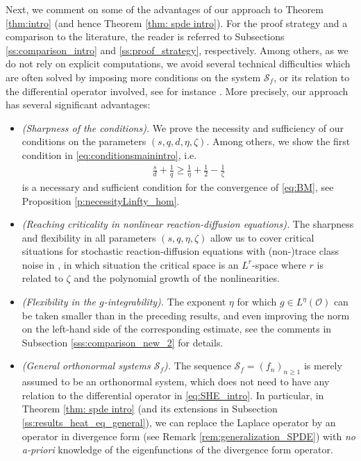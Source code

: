 \documentclass[reqno]{amsart}
\theoremstyle{plain}
\theoremstyle{remark}
\theoremstyle{plain}
\numberwithin{equation}{section}
\newcommand\cO{\mathcal{O}}
\newcommand{\1}{\one}
\newcommand{\Sf}{\mathcal{S}_{f}}
\begin{document}
\smallskip

Next, we comment on some of the advantages of our approach to Theorem \ref{thm:intro} (and hence Theorem \ref{thm: spde intro}). For the proof strategy and a comparison to the literature, the reader is referred to Subsections  \ref{ss:comparison_intro} and \ref{ss:proof_strategy}, respectively.
Among others, as we do not rely on explicit computations, we avoid several technical difficulties which are often solved by imposing more conditions on the system $\Sf$, or its relation to the differential operator involved, see for instance \cite{cerrai2009khasminskii}.
%
More precisely, our approach has several significant advantages:
\begin{itemize}
  \item \emph{(Sharpness of the conditions).} We prove the necessity and sufficiency of our conditions on the parameters $(s,q,d,\eta,\zeta)$. Among others, we show the first condition in \eqref{eq:conditionsmainintro}, i.e.\ 
    \begin{align*}
    \frac{s}{d}+\frac{1}{q} \geq \frac{1}{\eta}+\frac12 -\frac{1}{\zeta}
    \end{align*}
    is a necessary and sufficient condition for the convergence of \eqref{eq:BM}, see Proposition \ref{p:necessityLinfty_hom}.
    \item  \emph{(Reaching criticality in nonlinear reaction-diffusion equations).} The sharpness and flexibility in all parameters $(s,q,\eta,\zeta)$ allow us to cover critical situations for stochastic reaction-diffusion equations with (non-)trace class noise in \cite{AGVlocal, AVreaction-local}, in which situation the critical space is an $L^r$-space where $r$ is related to $\zeta$ and the polynomial growth of the nonlinearities.
    \item \emph{(Flexibility in the $g$-integrability).} The exponent $\eta$ for which $g\in L^\eta(\cO)$ can be taken smaller than in the preceding results, and even improving the norm on the left-hand side of the corresponding estimate, see the comments in Subsection \ref{sss:comparison_new_2} for details.
    \item \emph{(General orthonormal systems $\Sf$).}  The sequence $\Sf = (f_n)_{n\geq 1}$ is merely assumed to be an orthonormal system, which does not need to have any relation to the differential operator in \eqref{eq:SHE_intro}. In particular, in Theorem \ref{thm: spde intro} (and its extensions in Subsection \ref{ss:results_heat_eq_general}), we can replace the Laplace operator by an operator in divergence form (see Remark \ref{rem:generalization_SPDE}) with \emph{no a-priori} knowledge of the eigenfunctions of the divergence form operator. 

\end{itemize}
\end{document}
